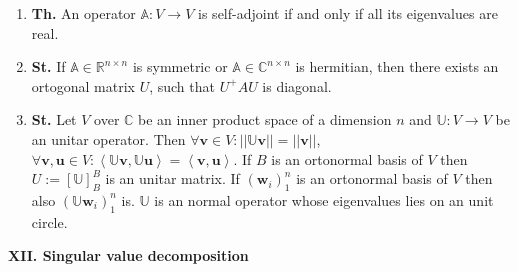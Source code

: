 \documentclass{article}
\newcommand{\<}{\left<}
\renewcommand{\>}{\right>}
\newcommand*\norm[1]{||#1||}
\newcommand*\op[1]{\mathbb{#1}}
\newcommand{\R}{\mathbb{R}}
\newcommand{\C}{\mathbb{C}}
\newcommand{\state}{\textbf{St. }}
\newcommand{\theor}{\textbf{Th. }}
\begin{document}
\begin{multicols}{3}
\begin{enumerate}[itemsep=2pt, topsep=2pt, partopsep=2pt, parsep=2pt]
        \item \theor An operator $\op A:V\to V$ is self-adjoint if and only if all its eigenvalues are real.
        \item \state If $\op A\in\R^{n\times n}$ is symmetric or $\op A\in\C^{n\times n}$ is hermitian, then there exists an ortogonal matrix $U$, such that $U^+AU$ is diagonal.
        \item \state Let $V$ over $\C$ be an inner product space of a dimension $n$ and $\op U:V\to V$ be an
         unitar operator. Then $\forall\bm v\in V:\norm{\op U\bm v}=\norm{\bm v}$, $\forall\bm v,\bm u\in V:\<\op U\bm v,\op U\bm u\>=\<\bm v,\bm u\>$. If $B$ is an ortonormal basis of $V$ then $U:=[\op U]_B^B$ is an unitar matrix. If $(\bm w_i)_1^n$ is an ortonormal basis of $V$ then also
         $(\op U\bm w_i)_1^n$ is. $\op U$ is an normal operator whose eigenvalues lies on an unit circle.

    \end{enumerate}

    \textbf{XII. Singular value decomposition}

    \begin{enumerate}[itemsep=2pt, topsep=2pt, partopsep=2pt, parsep=2pt]


\end{enumerate}
\end{multicols}
\end{document}
